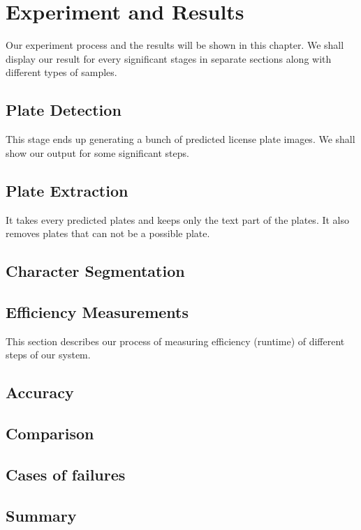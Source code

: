 \chapter{Experiment and Results}
Our experiment process and the results will be shown in this chapter. We shall display our result for every significant stages in separate sections along with different types of samples.


\section{Plate Detection}
This stage ends up generating a bunch of predicted license plate images. We shall show our output for some significant steps.
  
  
  
  
  


\section{Plate Extraction}
It takes every predicted plates and keeps only the text part of the plates. It also removes plates that can not be a possible plate.
  
  
  
  


\section{Character Segmentation}  


\section{Efficiency Measurements}
This section describes our process of measuring efficiency (runtime) of different steps of our system.
  
  
  

\section{Accuracy}


\section{Comparison}


\section{Cases of failures}


\section{Summary}


